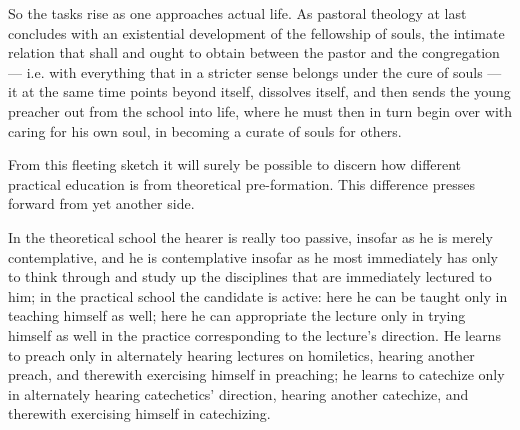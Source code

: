 \documentclass[12pt,a4paper]{book}
\begin{document}
So the tasks rise as one approaches actual life. As pastoral theology at last concludes with an
existential development of the fellowship of souls, the intimate relation that shall and ought to obtain
between the pastor and the congregation --- i.e. with everything that in a stricter sense belongs under
the cure of souls --- it at the same time points beyond itself, dissolves itself, and then sends the
young preacher out from the school into life, where he must then in turn begin over with caring for his
own soul, in becoming a curate of souls for others.

From this fleeting sketch it will surely be possible to discern how different practical education is
from theoretical
pre-formation. This difference presses forward from yet another side.

In the theoretical school the hearer is really too passive, insofar as he is merely contemplative, and he
is contemplative insofar as he most immediately has only to think through and study up the disciplines
that are immediately lectured to him; in the practical school the candidate is active: here he can be
taught only in teaching himself as well; here he can appropriate the lecture only in trying himself as
well in the practice corresponding to the lecture's direction. He learns to preach only in alternately
hearing lectures on homiletics, hearing another preach, and therewith exercising himself in preaching; he
learns to catechize only in alternately hearing catechetics' direction, hearing another catechize, and
therewith exercising himself in catechizing.
\end{document}
